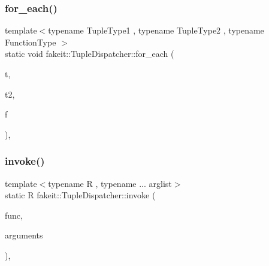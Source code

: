 \mbox{\label{structfakeit_1_1TupleDispatcher_a1ddb90f24aa73dd61bf2b95c5f176cd5}} 
\subsubsection{\texorpdfstring{for\_each()}{for\_each()}\hspace{0.1cm}{\footnotesize\ttfamily [54/54]}}
{\footnotesize\ttfamily template$<$typename Tuple\+Type1 , typename Tuple\+Type2 , typename Function\+Type $>$ \\
static void fakeit\+::\+Tuple\+Dispatcher\+::for\+\_\+each (\begin{DoxyParamCaption}\item[{Tuple\+Type1 \&\&}]{t,  }\item[{Tuple\+Type2 \&\&}]{t2,  }\item[{Function\+Type \&}]{f }\end{DoxyParamCaption})\hspace{0.3cm}{\ttfamily [inline]}, {\ttfamily [static]}}

\mbox{\label{structfakeit_1_1TupleDispatcher_a279619fd6d6649c4d99c459a3286469a}} 
\subsubsection{\texorpdfstring{invoke()}{invoke()}\hspace{0.1cm}{\footnotesize\ttfamily [1/9]}}
{\footnotesize\ttfamily template$<$typename R , typename ... arglist$>$ \\
static R fakeit\+::\+Tuple\+Dispatcher\+::invoke (\begin{DoxyParamCaption}\item[{std\+::function$<$ R(arglist \&...)$>$}]{func,  }\item[{const std\+::tuple$<$ arglist... $>$ \&}]{arguments }\end{DoxyParamCaption})\hspace{0.3cm}{\ttfamily [inline]}, {\ttfamily [static]}}

\mbox{\label{structfakeit_1_1TupleDispatcher_a279619fd6d6649c4d99c459a3286469a}} 
